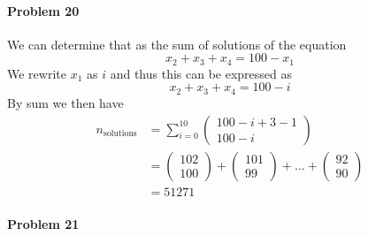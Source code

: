 \paragraph{Problem 20}
We can determine that as the sum of solutions of the equation
\[
    x_{2}+x_{3}+x_{4}=100-x_{1}
\]
We rewrite $x_{1}$ as $i$ and thus this can be expressed as
\[
    x_{2}+x_{3}+x_{4}=100-i
\]
By sum we then have
\begin{align*}
n_{\text{solutions}}&=\sum_{i=0}^{10}\begin{pmatrix}100-i+3-1\\100-i\end{pmatrix} \\
                   &=\begin{pmatrix}102\\100\end{pmatrix}+\begin{pmatrix}101\\99\end{pmatrix}+\ldots+\begin{pmatrix}92\\90\end{pmatrix} \\
                   &=51271
\end{align*}
\paragraph{Problem 21}
